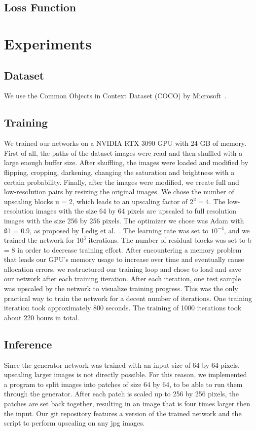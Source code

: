 \documentclass[11pt,twocolumn,twoside,paper=a4]{IEEEtran}
\begin{document}
\subsection{Loss Function}

\section{Experiments}

\subsection{Dataset}
We use the Common Objects in Context Dataset (COCO) by Microsoft~\cite{lin2015microsoft}.


\subsection{Training}
We trained our networks on a NVIDIA RTX 3090 GPU with 24 GB of memory. 
First of all, the paths of the dataset images were read and then shuffled with a large enough buffer size. 
After shuffling, the images were loaded and modified by flipping, cropping, darkening, changing the saturation and brightness with a certain probability. 
Finally, after the images were modified, we create full and low-resolution pairs by resizing the original images. 
We chose the number of upscaling blocks u = 2, which leads to an upscaling factor of $2^{u} = 4$.  
The low-resolution images with the size 64 by 64 pixels are upscaled to full resolution images with the size 256 by 256 pixels.
The optimizer we chose was Adam with ß1 = 0.9, as proposed by Ledig et al.~\cite{DBLP:journals/corr/LedigTHCATTWS16}. 
The learning rate was set to $10^{-4}$, and we trained the network for $10^3$ iterations.
The number of residual blocks was set to b = 8 in order to decrease training effort. 
After encountering a memory problem that leads our GPU's memory usage to increase over time and eventually cause allocation errors, we restructured our training loop and chose to load and save our network after each training iteration. 
After each iteration, one test sample was upscaled by the network to visualize training progress.
This was the only practical way to train the network for a decent number of iterations. 
One training iteration took approximately 800 seconds. The training of 1000 iterations took about 220 hours in total.


\subsection{Inference}
Since the generator network was trained with an input size of 64 by 64 pixels, upscaling larger images is not directly possible.
For this reason, we implemented a program to split images into patches of size 64 by 64, to be able to run them through the generator.
After each patch is scaled up to 256 by 256 pixels, the patches are set back together, resulting in an image that is four times larger then the input. 
Our git repository features a version of the trained network and the script to perform upscaling on any jpg images.
\end{document}

